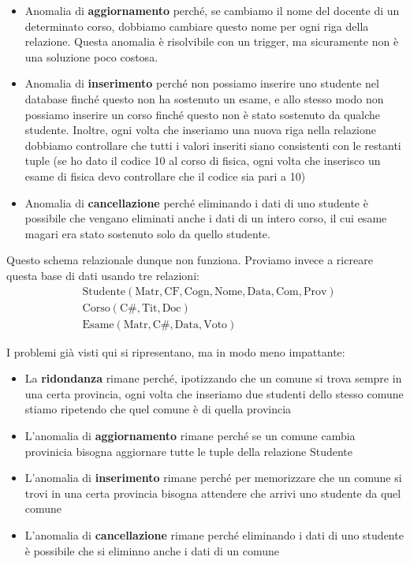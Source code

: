 \documentclass[11pt, a4paper, titlepage, oneside]{scrbook}
\begin{document}
\begin{itemize}
    \item Anomalia  di \textbf{aggiornamento} perché, se cambiamo il nome del docente di un determinato corso, dobbiamo cambiare questo nome per ogni riga della relazione. Questa anomalia è risolvibile con un trigger, ma sicuramente non è una soluzione poco costosa. 
    \item Anomalia di \textbf{inserimento} perché non possiamo inserire uno studente nel database finché questo non ha sostenuto un esame, e allo stesso modo non possiamo inserire un corso finché questo non è stato sostenuto da qualche studente. Inoltre, ogni volta che inseriamo una nuova riga nella relazione dobbiamo controllare che tutti i valori inseriti siano consistenti con le restanti tuple (se ho dato il codice 10 al corso di fisica, ogni volta che inserisco un esame di fisica devo controllare che il codice sia pari a 10)
    \item Anomalia di \textbf{cancellazione} perché eliminando i dati di uno studente è possibile che vengano eliminati anche i dati di un intero corso, il cui esame magari era stato sostenuto solo da quello studente. 
\end{itemize}

Questo schema relazionale dunque non funziona. Proviamo invece a ricreare questa base di dati usando tre relazioni:
\begin{align*}
& \text{Studente}(\text{Matr}, \text{CF}, \text{Cogn}, \text{Nome}, \text{Data}, \text{Com}, \text{Prov}) \\
&\text{Corso} (\text{C}\#, \text{Tit}, \text{Doc}) \\
&\text{Esame} (\text{Matr}, \text{C}\#, \text{Data}, \text{Voto})
\end{align*}

I problemi già visti qui si ripresentano, ma in modo meno impattante:
\begin{itemize}
    \item La \textbf{ridondanza} rimane perché, ipotizzando che un comune si trova sempre in una certa provincia, ogni volta che inseriamo due studenti dello stesso comune stiamo ripetendo che quel comune è di quella provincia
    \item L'anomalia di \textbf{aggiornamento} rimane perché se un comune cambia provinicia bisogna aggiornare tutte le tuple della relazione Studente
    \item L'anomalia di \textbf{inserimento} rimane perché per memorizzare che un comune si trovi in una certa provincia bisogna attendere che arrivi uno studente da quel comune
    \item L'anomalia di \textbf{cancellazione} rimane perché eliminando i dati di uno studente è possibile che si eliminno anche i dati di un comune
\end{itemize}
\end{document}
